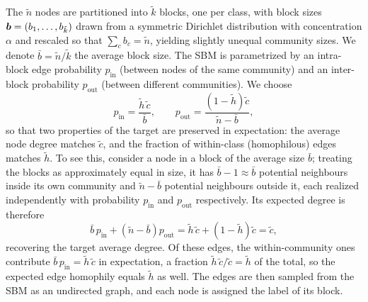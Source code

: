 The \( \tilde{n} \) nodes are partitioned into \( \tilde{k} \) blocks, one per class, with block sizes \( \boldsymbol{b} = \left( b_1, \dots, b_{\tilde{k}} \right) \) drawn from a symmetric Dirichlet distribution with concentration \( \alpha \) and rescaled so that \( \sum_{c} b_c = \tilde{n} \), yielding slightly unequal community sizes. We denote \( \bar{b} = \tilde{n} / \tilde{k} \) the average block size. The SBM is parametrized by an intra-block edge probability \( p_\text{in} \) (between nodes of the same community) and an inter-block probability \( p_\text{out} \) (between different communities). We choose
\begin{equation*}
	p_\text{in} = \frac{\tilde{h} \, \tilde{c}}{\bar{b}}, \qquad p_\text{out} = \frac{\left( 1 - \tilde{h} \right) \tilde{c}}{\tilde{n} - \bar{b}},
\end{equation*}
so that two properties of the target are preserved in expectation: the average node degree matches \( \tilde{c} \), and the fraction of within-class (homophilous) edges matches \( \tilde{h} \). To see this, consider a node in a block of the average size \( \bar{b} \); treating the blocks as approximately equal in size, it has \( \bar{b} - 1 \approx \bar{b} \) potential neighbours inside its own community and \( \tilde{n} - \bar{b} \) potential neighbours outside it, each realized independently with probability \( p_\text{in} \) and \( p_\text{out} \) respectively. Its expected degree is therefore
\begin{equation*}
	\bar{b} \, p_\text{in} + \left( \tilde{n} - \bar{b} \right) p_\text{out} = \tilde{h} \, \tilde{c} + \left( 1 - \tilde{h} \right) \tilde{c} = \tilde{c},
\end{equation*}
recovering the target average degree. Of these edges, the within-community ones contribute \( \bar{b} \, p_\text{in} = \tilde{h} \, \tilde{c} \) in expectation, a fraction \( \tilde{h} \, \tilde{c} / \tilde{c} = \tilde{h} \) of the total, so the expected edge homophily equals \( \tilde{h} \) as well. The edges are then sampled from the SBM as an undirected graph, and each node is assigned the label of its block.

